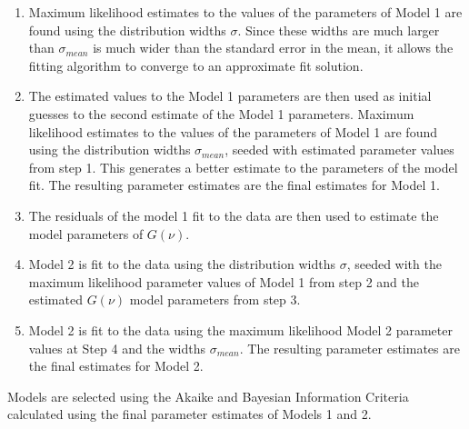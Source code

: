 \documentclass{aastex}
\begin{document}
\begin{enumerate}
\item Maximum likelihood estimates to the values of the parameters of
  Model 1 are found using the distribution widths $\sigma$.  Since
  these widths are much larger than $\sigma_{mean}$ is much wider than
  the standard error in the mean, it allows the fitting algorithm to
  converge to an approximate fit solution.
\item The estimated values to the Model 1 parameters are then used as
  initial guesses to the second estimate of the Model 1
  parameters. Maximum likelihood estimates to the values of the
  parameters of Model 1 are found using the distribution widths
  $\sigma_{mean}$, seeded with estimated parameter values from step 1.
  This generates a better estimate to the parameters of the model
  fit.  The resulting parameter estimates are the final estimates for
  Model 1.
\item The residuals of the model 1 fit to the data are then used to
  estimate the model parameters of $G(\nu)$.
\item Model 2 is fit to the data using the distribution widths
  $\sigma$, seeded with the maximum likelihood parameter values of
  Model 1 from step 2 and the estimated $G(\nu)$ model parameters from
  step 3.
\item Model 2 is fit to the data using the maximum likelihood Model 2
  parameter values at Step 4 and the widths $\sigma_{mean}$.  The
  resulting parameter estimates are the final estimates for Model 2.
\end{enumerate}

Models are selected using the Akaike and Bayesian Information Criteria
\cite{2007MNRAS.377L..74L} calculated using the final parameter
estimates of Models 1 and 2.



\end{document}
